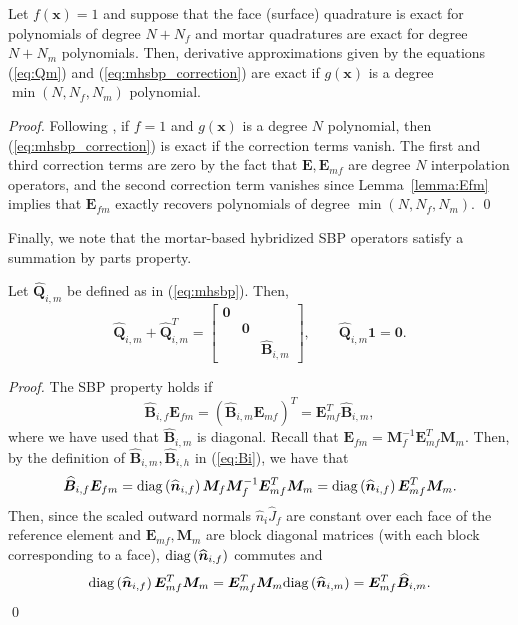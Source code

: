 \documentclass{svjour3}                     %
\renewcommand{\hat}{\widehat}
\newcommand{\diag}[1]{{\rm diag}\LRp{#1}}
\newcommand{\LRp}[1]{\left( #1 \right)}
\begin{document}
\begin{lemma}
\label{lemma:accuracy}
Let $f(\bm{x}) = 1$ and suppose that the face (surface) quadrature is exact for polynomials of degree $N+N_f$ and mortar quadratures are exact for degree $N+N_m$ polynomials.  Then, derivative approximations given by the equations (\ref{eq:Qm}) and (\ref{eq:mhsbp_correction}) are exact if $g(\bm{x})$ is a degree $\min(N,N_f,N_m)$ polynomial.
\end{lemma}
\begin{proof}
Following \cite{chan2017discretely}, if $f = 1$  and $g(\bm{x})$ is a degree $N$ polynomial, then  (\ref{eq:mhsbp_correction}) is exact if the correction terms vanish.  The first and third correction terms are zero by the fact that $\bm{E}, \bm{E}_{mf}$ are degree $N$ interpolation operators, and the second correction term vanishes since Lemma~\ref{lemma:Efm} implies that $\bm{E}_{fm}$ exactly recovers polynomials of degree $\min(N,N_f,N_m)$.
\qed\end{proof}

Finally, we note that the mortar-based hybridized SBP operators satisfy a summation by parts property.
\begin{lemma}
\label{lemma:mhsbp}
Let $\hat{\bm{Q}}_{i,m}$ be defined as in (\ref{eq:mhsbp}).  Then, 
\[
\hat{\bm{Q}}_{i,m} + \hat{\bm{Q}}_{i,m}^T = \begin{bmatrix}
\bm{0} && \\
&\bm{0} &\\
&& \hat{\bm{B}}_{i,m}\end{bmatrix}, \qquad \hat{\bm{Q}}_{i,m}\bm{1} = \bm{0}.
\]
\end{lemma}
\begin{proof}
The SBP property holds if 
\begin{equation}
\hat{\bm{B}}_{i,f} \bm{E}_{fm} = (\hat{\bm{B}}_{i,m} \bm{E}_{mf})^T = \bm{E}_{mf}^T\hat{\bm{B}}_{i,m},  
\label{eq:mhsbpprop}
\end{equation}
where we have used that $\hat{\bm{B}}_{i,m}$ is diagonal.  Recall that $\bm{E}_{fm} = \bm{M}_f^{-1}\bm{E}_{mf}^T\bm{M}_m$.  
Then, by the definition of $\hat{\bm{B}}_{i,m}, \hat{\bm{B}}_{i,h}$ in (\ref{eq:Bi}), we have that
\begin{align*}
\hat{\bm{B}}_{i,f} \bm{E}_{fm} = \diag{\hat{\bm{n}}_{i,f}}\bm{M}_f \bm{M}_f^{-1} \bm{E}_{mf}^T\bm{M}_m 
= \diag{\hat{\bm{n}}_{i,f}} \bm{E}_{mf}^T\bm{M}_m.
\end{align*}
Then, since the scaled outward normals $\hat{n}_i\hat{J}_f$  are constant over each face of the reference element and $\bm{E}_{mf}, \bm{M}_m$ are block diagonal matrices (with each block corresponding to a face), $\diag{\hat{\bm{n}}_{i,f}}$ commutes and 
\[
\diag{\hat{\bm{n}}_{i,f}} \bm{E}_{mf}^T\bm{M}_m =\bm{E}_{mf}^T\bm{M}_m \diag{\hat{\bm{n}}_{i,m}}= \bm{E}_{mf}^T\hat{\bm{B}}_{i,m}.
\]  
\qed\end{proof}
\end{document}
